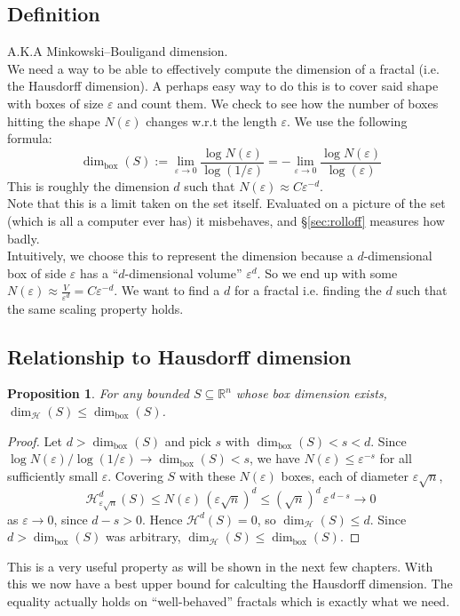 \documentclass[11pt, a4paper]{article}
\theoremstyle{plain}
\newtheorem{proposition}[theorem]{Proposition}
\theoremstyle{definition}
\theoremstyle{remark}
\newcommand{\Hm}[1]{\mathcal{H}^{#1}}   %
\newcommand{\Hd}{\dim_{\mathcal{H}}}     %
\newcommand{\Bd}{\dim_{\mathrm{box}}}    %
\newcommand{\eps}{\varepsilon}
\begin{document}
\subsection{Definition}
\label{sec:boxdef}
A.K.A Minkowski–Bouligand dimension.\\
We need a way to be able to effectively compute the dimension of a fractal (i.e. the Hausdorff dimension). A perhaps easy way to do this is to cover said shape with boxes of size $\eps$ and count them. We check to see how the number of boxes hitting the shape $N(\eps)$ changes w.r.t the length $\eps$. We use the following formula: 
\[
\Bd(S) := \lim\limits_{\eps\rightarrow0}\frac{\log N(\eps)}{\log (1/\eps)} = -\lim\limits_{\eps\rightarrow0}\frac{\log N(\eps)}{\log (\eps)}
\]
This is roughly the dimension $d$ such that $N(\eps) \approx C\eps^{-d}$.\\
Note that this is a limit taken on the set itself. Evaluated on a picture of the set (which is all a computer ever has) it misbehaves, and \S\ref{sec:rolloff} measures how badly.\\
Intuitively, we choose this to represent the dimension because a $d$-dimensional box of side $\eps$ has a ``$d$-dimensional volume'' $\eps^d$. So we end up with some $N(\eps) \approx \frac{V}{\eps^{d}} = C\eps^{-d}$. We want to find a $d$ for a fractal i.e. finding the $d$ such that the same scaling property holds.

\subsection{Relationship to Hausdorff dimension}
\begin{proposition}
    For any bounded $S\subseteq\mathbb{R}^n$ whose box dimension exists,
    $\Hd(S)\leq\Bd(S)$.
\end{proposition}
\begin{proof}
    Let $d>\Bd(S)$ and pick $s$ with $\Bd(S)<s<d$. 
    Since $\log N(\eps)/\log(1/\eps)\to\Bd(S)<s$, we have $N(\eps)\leq\eps^{-s}$ 
    for all sufficiently small $\eps$. Covering $S$ with these $N(\eps)$ boxes, each of diameter $\eps\sqrt{n}$,
    \[
    \Hm{d}_{\eps\sqrt{n}}(S)\leq N(\eps)\,(\eps\sqrt{n})^d
    \leq(\sqrt{n})^d\,\eps^{\,d-s}\rightarrow0
    \]
    as $\eps\rightarrow0$, since $d-s>0$. Hence $\Hm{d}(S)=0$, so
    $\Hd(S)\leq d$. Since $d>\Bd(S)$ was arbitrary, $\Hd(S)\leq\Bd(S)$.
\end{proof}
\noindent This is a very useful property as will be shown in the next few chapters. With this we now have a best upper bound for calculting the Hausdorff dimension. The equality actually holds on ``well-behaved'' fractals which is exactly what we need. 
\newpage
\end{document}
